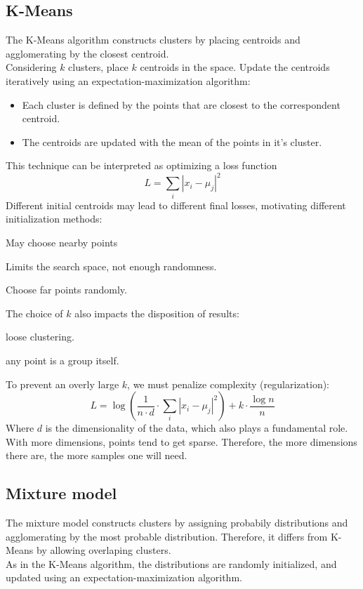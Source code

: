 \documentclass[11pt]{article}
\begin{document}
\subsection{K-Means}
\label{sec:orgf698046}
The K-Means algorithm constructs clusters by placing centroids and agglomerating by the
closest centroid. \\
Considering \(k\) clusters, place \(k\) centroids in the space. Update the centroids
iteratively using an expectation-maximization algorithm:
\begin{itemize}[itemsep=0pt]
\item Each cluster is defined by the points that are closest to the correspondent centroid.
\item The centroids are updated with the mean of the points in it's cluster.
\end{itemize}
This technique can be interpreted as optimizing a loss function
\[
  L = \sum_i \left| x_i - \mu_j \right|^2
\]
Different initial centroids may lead to different final losses, motivating different
initialization methods:
\begin{description}[itemsep=0pt]
\item[{Random:}] May choose nearby points
\item[{Distance based:}] Limits the search space, not enough randomness.
\item[{Random and distance based:}] Choose far points randomly.
\end{description}
The choice of \(k\) also impacts the disposition of results:
\begin{description}[itemsep=0pt]
\item[{Small \(k\):}] loose clustering.
\item[{Large \(k\):}] any point is a group itself.
\end{description}
To prevent an overly large \(k\), we must penalize complexity (regularization):
\[
  L = \log \left( \frac{1}{n \cdot d} \cdot \sum_i \left| x_i - \mu_j \right|^2 \right) + k \cdot \frac{\log{n}}{n}
\]
Where \(d\) is the dimensionality of the data, which also plays a fundamental role. With
more dimensions, points tend to get sparse. Therefore, the more dimensions there are,
the more samples one will need.
\subsection{Mixture model}
\label{sec:org5e27150}
The mixture model constructs clusters by assigning probabily distributions and
agglomerating by the most probable distribution. Therefore, it differs from K-Means by
allowing overlaping clusters. \\
As in the K-Means algorithm, the distributions are randomly initialized, and updated
using an expectation-maximization algorithm.
\end{document}
